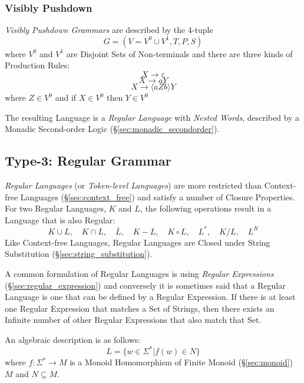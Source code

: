 \subsubsection{Visibly Pushdown}\label{sec:visibly_pushdown}

\emph{Visibly Pushdown Grammars} are described by the 4-tuple
\[
  G = (V=V^0 \cup V^1,T,P,S)
\]
where $V^0$ and $V^1$ are Disjoint Sets of Non-terminals and there
are three kinds of Production Rules:
\[
  X \rightarrow \varepsilon
\]\[
  X \rightarrow aY
\]\[
  X \rightarrow \langle aZb \rangle Y
\]
where $Z \in V^0$ and if $X \in V^0$ then $Y \in V^0$

The resulting Language is a \emph{Regular Language} with \emph{Nested
  Words}, described by a Monadic Second-order Logic
(\S\ref{sec:monadic_secondorder}).



\subsection{Type-3: Regular Grammar} \label{sec:regular_language}

\emph{Regular Languages} (or \emph{Token-level Languages}) are more
restricted than Context-free Languages (\S\ref{sec:context_free}) and
satisfy a number of Closure Properties. For two Regular Languages, $K$
and $L$, the following operations result in a Language that is also
Regular:
\[
  K \cup L, \quad
  K \cap L, \quad
  \overline{L}, \quad
  K - L, \quad
  K \circ L, \quad
  L^*, \quad
  K / L, \quad
  L^R
\]
Like Context-free Languages, Regular Languages are Closed under String
Substitution (\S\ref{sec:string_substitution}).

A common formulation of Regular Languages is using \emph{Regular
  Expressions} (\S\ref{sec:regular_expression}) and conversely it is
sometimes said that a Regular Language is one that can be defined by a
Regular Expression. If there is at least one Regular Expression that
matches a Set of Strings, then there exists an Infinite number of
other Regular Expressions that also match that Set.

An algebraic description is as follows:
\[
  L = \{ w \in \Sigma^* | f(w) \in N \}
\]
where $f : \Sigma^* \rightarrow M$ is a Monoid Homomorphism of Finite
Monoid (\S\ref{sec:monoid}) $M$ and $N \subseteq M$.



